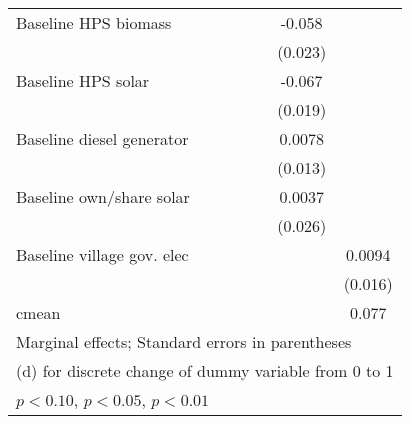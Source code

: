 \begin{table}[htbp]
\begin{tabular*}{1\hsize}{@{\hskip\tabcolsep\extracolsep\fill}l*{6}{c}}
Baseline HPS biomass&                  &                  &                  &                  &   -0.058\sym{**} &                  \\
                &                  &                  &                  &                  &  (0.023)         &                  \\
Baseline HPS solar&                  &                  &                  &                  &   -0.067\sym{***}&                  \\
                &                  &                  &                  &                  &  (0.019)         &                  \\
Baseline diesel generator&                  &                  &                  &                  &   0.0078         &                  \\
                &                  &                  &                  &                  &  (0.013)         &                  \\
Baseline own/share solar&                  &                  &                  &                  &   0.0037         &                  \\
                &                  &                  &                  &                  &  (0.026)         &                  \\
Baseline village gov. elec&                  &                  &                  &                  &                  &   0.0094         \\
                &                  &                  &                  &                  &                  &  (0.016)         \\
\midrule
cmean           &                  &                  &                  &                  &                  &    0.077         \\
\bottomrule
\multicolumn{7}{l}{\footnotesize Marginal effects; Standard errors in parentheses}\\
\multicolumn{7}{l}{\footnotesize  (d) for discrete change of dummy variable from 0 to 1}\\
\multicolumn{7}{l}{\footnotesize \sym{*} \(p<0.10\), \sym{**} \(p<0.05\), \sym{***} \(p<0.01\)}\\
\end{tabular*}
\end{table}
